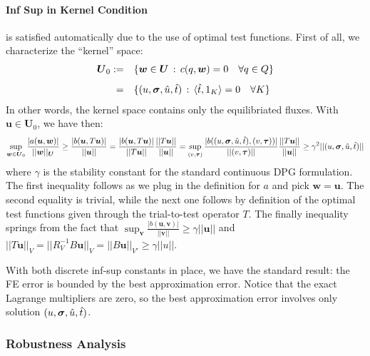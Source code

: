 \documentclass[letterpaper]{article}
\def\bftau{\boldsymbol\tau}
\newcommand{\bfsig}{\mbox{\boldmath $\sigma$}}
\newcommand{\bfv}{\boldsymbol v}
\newcommand{\bfu}{\boldsymbol u}
\newcommand{\bfU}{\boldsymbol U}
\newcommand{\bfw}{\boldsymbol w}
\begin{document}
\paragraph{Inf Sup in Kernel Condition} is satisfied automatically due to the use of optimal
test functions. First of all, we characterize the ``kernel'' space:
\begin{equation}
\begin{array}{rl}
\bfU_0  := & \{ \bfw \in \bfU \, : \, c(q,\bfw) = 0 \quad \forall q \in Q\} \\[8pt]
 = &\{ (u,\bfsig,\hat{u},\hat{t}) \, : \, \langle \hat{t},1_K \rangle = 0
 \quad \forall K \}
\end{array}
\end{equation}
In other words, the kernel space contains only the equilibriated fluxes.
With $\bfu \in \bfU_0$, we have then:
\begin{equation}
   \sup_{\bfw \in \bfU_0} \frac{| a(\bfu,\bfw) |}{|| \bfw ||_{\bfU} }
   \geq \frac{| b(\bfu,T \bfu) |}{|| \bfu ||}
   = \frac{| b(\bfu,T \bfu) |}{|| T\bfu ||}\frac{||T\bfu||}{||\bfu||}
   = \sup_{(v,\bftau)}\frac{| b((u,\bfsig,\hat{u},\hat{t}), (v,\bftau)) |}{|| (v,\bftau) ||}
   \frac{||T\bfu||}{||\bfu||}
   \geq \gamma^2 || (u,\bfsig,\hat{u},\hat{t}) ||
\end{equation}
where $\gamma$ is the stability constant for the standard continuous DPG formulation.
The first inequality follows as we plug in the definition for $a$ and pick
$\bfw=\bfu$. The second equality is trivial, while the next one follows by definition of the optimal test
functions given through the trial-to-test operator $T$. The finally inequality
springs from the fact that
$\sup_{\bfv}\frac{|b(\bfu,\bfv)|}{||\bfv||}\geq\gamma||\bfu||$ and
$||T\bfu||_V=||R_V^{-1}B\bfu||_V=||B\bfu||_{V'}\geq\gamma||u||$.

With both discrete inf-sup constants in place, we have the standard result: the FE error
is bounded by the best approximation error. Notice that the exact Lagrange multipliers
are zero, so the best approximation error involves only solution $(u,\bfsig,\hat{u},\hat{t})$.


\subsubsection{Robustness Analysis}
\label{sec:robustnessAnalysis}
\end{document}

